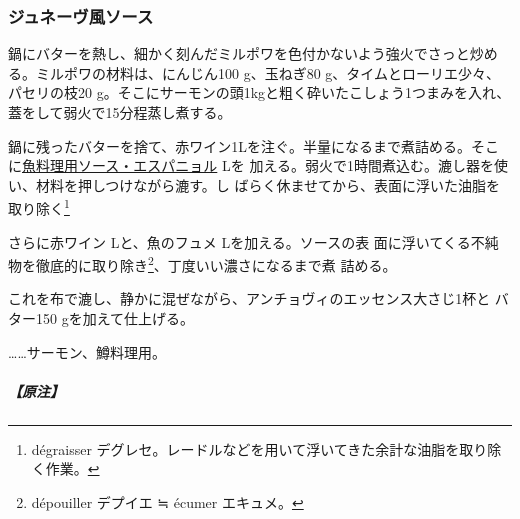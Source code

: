 \begin{recette}
\hypertarget{sauce-genevoise}{%
\subsubsection{ジュネーヴ風ソース}\label{sauce-genevoise}}



鍋にバターを熱し、細かく刻んだミルポワを色付かないよう強火でさっと炒め
る。ミルポワの材料は、にんじん100 g、玉ねぎ80 g、タイムとローリエ少々、
パセリの枝20 g。そこにサーモンの頭1kgと粗く砕いたこしょう1つまみを入れ、
蓋をして弱火で15分程蒸し煮する。

鍋に残ったバターを捨て、赤ワイン1Lを注ぐ。半量になるまで煮詰める。そこ
に\protect\hyperlink{sauce-espagnole-maigre}{魚料理用ソース・エスパニョル}\undemi{}
Lを
加える。弱火で1時間煮込む。漉し器を使い、材料を押しつけながら漉す。し
ばらく休ませてから、表面に浮いた油脂を取り除く\footnote{dégraisser
  デグレセ。レードルなどを用いて浮いてきた余計な油脂を取り除く作業。}

さらに赤ワイン\undemi{} Lと、魚のフュメ\undemi{} Lを加える。ソースの表
面に浮いてくる不純物を徹底的に取り除き\footnote{dépouiller デプイエ ≒
  écumer エキュメ。}、丁度いい濃さになるまで煮 詰める。

これを布で漉し、静かに混ぜながら、アンチョヴィのエッセンス大さじ1杯と
バター150 gを加えて仕上げる。

\ldots{}\ldots{}サーモン、鱒料理用。

\hypertarget{nota-sauce-genevoise}{%
\subparagraph{【原注】}\label{nota-sauce-genevoise}}


\end{recette}
